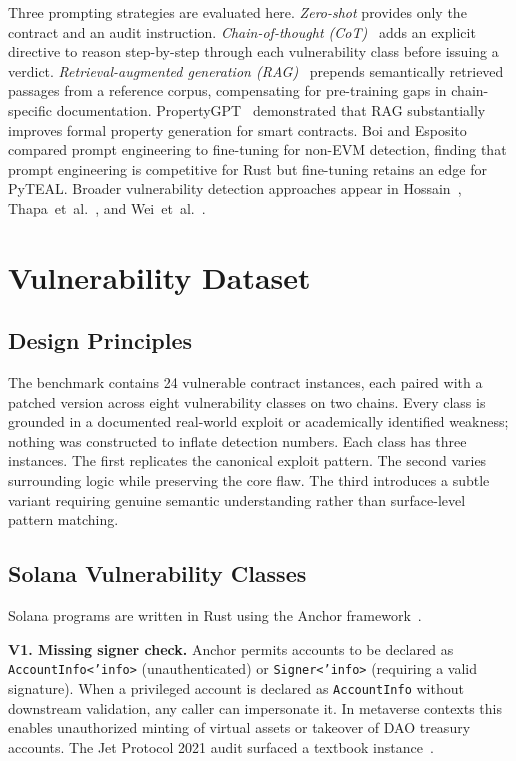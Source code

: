 \documentclass[runningheads]{llncs}
\begin{document}
Three prompting strategies are evaluated here.
\textit{Zero-shot} provides only the contract and an audit instruction.
\textit{Chain-of-thought (CoT)}~\cite{liu2024llm4vuln} adds an explicit directive
to reason step-by-step through each vulnerability class before issuing a verdict.
\textit{Retrieval-augmented generation (RAG)}~\cite{sun2024propertygpt} prepends
semantically retrieved passages from a reference corpus, compensating for
pre-training gaps in chain-specific documentation.
PropertyGPT~\cite{sun2024propertygpt} demonstrated that RAG substantially improves
formal property generation for smart contracts.
Boi and Esposito~\cite{boi2025prompt} compared prompt engineering to fine-tuning
for non-EVM detection, finding that prompt engineering is competitive for Rust
but fine-tuning retains an edge for PyTEAL.
Broader vulnerability detection approaches appear in
Hossain~\cite{hossain2025llmsc}, Thapa~et~al.~\cite{thapa2022transformer},
and Wei~et~al.~\cite{wei2025logicmeets}.

\section{Vulnerability Dataset}
\label{sec:dataset}

\subsection{Design Principles}

The benchmark contains 24 vulnerable contract instances, each paired with a
patched version across eight vulnerability classes on two chains.
Every class is grounded in a documented real-world exploit or academically
identified weakness; nothing was constructed to inflate detection numbers.
Each class has three instances. The first replicates the canonical exploit
pattern. The second varies surrounding logic while preserving the core flaw.
The third introduces a subtle variant requiring genuine semantic understanding
rather than surface-level pattern matching.

\subsection{Solana Vulnerability Classes}

Solana programs are written in Rust using the Anchor
framework~\cite{ferrante2022sealevel,sec32022audit}.

\textbf{V1. Missing signer check.}
Anchor permits accounts to be declared as \texttt{AccountInfo<'info>}
(unauthenticated) or \texttt{Signer<'info>} (requiring a valid signature).
When a privileged account is declared as \texttt{AccountInfo} without
downstream validation, any caller can impersonate it.
In metaverse contexts this enables unauthorized minting of virtual assets or
takeover of DAO treasury accounts.
The Jet Protocol 2021 audit surfaced a textbook instance~\cite{sec32022audit}.
\end{document}
